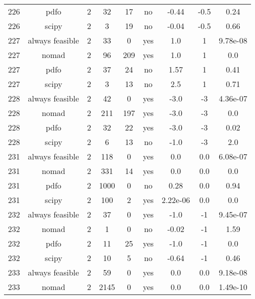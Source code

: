 \begin{scriptsize}
\begin{center}
\begin{longtable}{ccccccccc}
226 &            pdfo &  2 &     32 &     17 &      no &       -0.44 &        -0.5 &     0.24\\
226 &           scipy &  2 &      3 &     19 &      no &       -0.04 &        -0.5 &     0.66\\
227 & always feasible &  2 &     33 &      0 &     yes &         1.0 &           1 & 9.78e-08\\
227 &           nomad &  2 &     96 &    209 &     yes &         1.0 &           1 &      0.0\\
227 &            pdfo &  2 &     37 &     24 &      no &        1.57 &           1 &     0.41\\
227 &           scipy &  2 &      3 &     13 &      no &         2.5 &           1 &     0.71\\
228 & always feasible &  2 &     42 &      0 &     yes &        -3.0 &          -3 & 4.36e-07\\
228 &           nomad &  2 &    211 &    197 &     yes &        -3.0 &          -3 &      0.0\\
228 &            pdfo &  2 &     32 &     22 &     yes &        -3.0 &          -3 &     0.02\\
228 &           scipy &  2 &      6 &     13 &      no &        -1.0 &          -3 &      2.0\\
231 & always feasible &  2 &    118 &      0 &     yes &         0.0 &         0.0 & 6.08e-07\\
231 &           nomad &  2 &    331 &     14 &     yes &         0.0 &         0.0 &      0.0\\
231 &            pdfo &  2 &   1000 &      0 &      no &        0.28 &         0.0 &     0.94\\
231 &           scipy &  2 &    100 &      2 &     yes &    2.22e-06 &         0.0 &      0.0\\
232 & always feasible &  2 &     37 &      0 &     yes &        -1.0 &          -1 & 9.45e-07\\
232 &           nomad &  2 &      1 &      0 &      no &       -0.02 &          -1 &     1.59\\
232 &            pdfo &  2 &     11 &     25 &     yes &        -1.0 &          -1 &      0.0\\
232 &           scipy &  2 &     10 &      5 &      no &       -0.64 &          -1 &     0.46\\
233 & always feasible &  2 &     59 &      0 &     yes &         0.0 &         0.0 & 9.18e-08\\
233 &           nomad &  2 &   2145 &      0 &     yes &         0.0 &         0.0 & 1.49e-10\\

\end{longtable}
\end{center}
\end{scriptsize}
